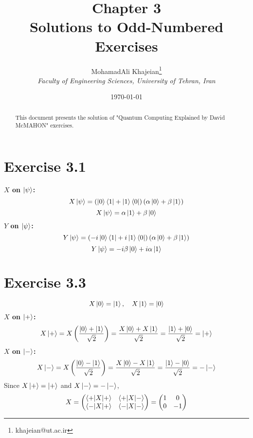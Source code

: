 \documentclass[12pt]{article}
\title{\textbf{Chapter 3} \\ \small Solutions to Odd-Numbered Exercises}
\author{
    MohamadAli Khajeian\footnote{khajeian@ut.ac.ir} \\ 
    \small \textit{Faculty of Engineering Sciences, University of Tehran, Iran} \\ 
}
\date{\today}
\begin{document}
\maketitle

\begin{abstract}
    This document presents the solution of "Quantum Computing Explained by David McMAHON" exercises.
\end{abstract}

\section*{Exercise 3.1}
\textbf{\( X \) on \( \ket{\psi} \):}
   \[
   X \ket{\psi} = \left( \ket{0} \bra{1} + \ket{1} \bra{0} \right) (\alpha \ket{0} + \beta \ket{1})
   \]
   \[
   X \ket{\psi} = \alpha \ket{1} + \beta \ket{0}
   \]
\textbf{\( Y \) on \( \ket{\psi} \):}
   \[
   Y \ket{\psi} = \left( -i \ket{0} \bra{1} + i \ket{1} \bra{0} \right) (\alpha \ket{0} + \beta \ket{1})
   \]
   \[
   Y \ket{\psi} = -i \beta \ket{0} + i \alpha \ket{1}
   \]
\section*{Exercise 3.3}
   \[
   X \ket{0} = \ket{1}, \quad X \ket{1} = \ket{0}
   \]
\textbf{\( X \) on \( \ket{+} \):}
    \[
    X \ket{+} = X \left( \frac{\ket{0} + \ket{1}}{\sqrt{2}} \right) = \frac{X \ket{0} + X \ket{1}}{\sqrt{2}} = \frac{\ket{1} + \ket{0}}{\sqrt{2}} = \ket{+}
    \]
\textbf{\( X \) on \( \ket{-} \):}
    \[
    X \ket{-} = X \left( \frac{\ket{0} - \ket{1}}{\sqrt{2}} \right) = \frac{X \ket{0} - X \ket{1}}{\sqrt{2}} = \frac{\ket{1} - \ket{0}}{\sqrt{2}} = -\ket{-}
    \]
   Since \( X \ket{+} = \ket{+} \) and \( X \ket{-} = -\ket{-} \),
   \[
   X =  \begin{pmatrix} \braket{+|X|+} & \braket{+|X|-} \\ \braket{-|X|+} & \braket{-|X|-} \end{pmatrix} = \begin{pmatrix} 1 & 0 \\ 0 & -1 \end{pmatrix}
   \]
\end{document}

